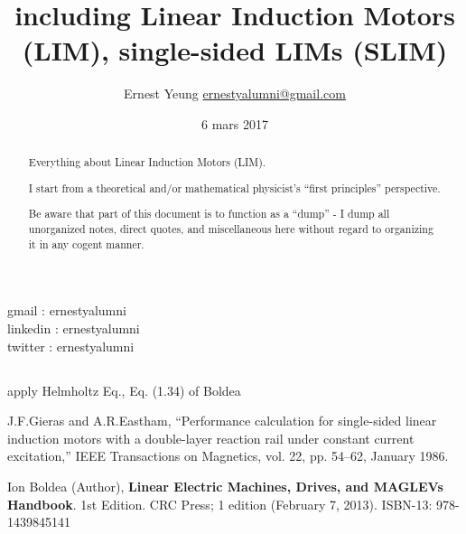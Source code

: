 \documentclass[10pt]{amsart}
\title{%
  \large including Linear Induction Motors (LIM), single-sided LIMs (SLIM)}
\author{Ernest Yeung \href{mailto:ernestyalumni@gmail.com}{ernestyalumni@gmail.com}}
\date{6 mars 2017}
\begin{document}

\maketitle


\noindent gmail        : ernestyalumni \\
linkedin     : ernestyalumni \\
twitter      : ernestyalumni \\

\begin{multicols*}{2}

  
\setcounter{tocdepth}{1}
\tableofcontents



\begin{abstract}
Everything about Linear Induction Motors (LIM).  

I start from a theoretical and/or mathematical physicist's ``first principles'' perspective.  

Be aware that part of this document is to function as a ``dump'' - I dump all unorganized notes, direct quotes, and miscellaneous here without regard to organizing it in any cogent manner.  

\end{abstract}

\part{}

apply Helmholtz Eq., Eq. (1.34) of Boldea


\end{multicols*}

\begin{thebibliography}{9}

J.F.Gieras and A.R.Eastham, “Performance calculation for single-sided linear induction motors with a double-layer reaction rail
under constant current excitation,” IEEE Transactions on Magnetics,
vol. 22, pp. 54–62, January 1986.


Ion Boldea (Author), \textbf{Linear Electric Machines, Drives, and MAGLEVs Handbook}. 1st Edition.  CRC Press; 1 edition (February 7, 2013).  ISBN-13: 978-1439845141


\bibitem{}


\end{thebibliography}
\end{document}
